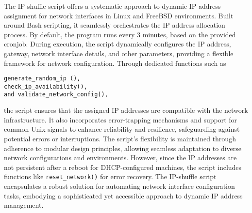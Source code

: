 The IP-shuffle script offers a systematic approach to dynamic IP address assignment for network interfaces in Linux and FreeBSD environments. Built around Bash scripting, it seamlessly orchestrates the IP address allocation process. By default, the program runs every 3 minutes, based on the provided cronjob. During execution, the script dynamically configures the IP address, gateway, network interface details, and other parameters, providing a flexible framework for network configuration. Through dedicated functions such as
\begin{verbatim}
generate_random_ip (), 
check_ip_availability(), 
and validate_network_config(), 
\end{verbatim}
the script ensures that the assigned IP addresses are compatible with the network infrastructure. It also incorporates error-trapping mechanisms and support for common Unix signals to enhance reliability and resilience, safeguarding against potential errors or interruptions. The script's flexibility is maintained through adherence to modular design principles, allowing seamless adaptation to diverse network configurations and environments. However, since the IP addresses are not persistent after a reboot for DHCP-configured machines, the script includes functions like \texttt{reset\_network()} for error recovery. The IP-shuffle script encapsulates a robust solution for automating network interface configuration tasks, embodying a sophisticated yet accessible approach to dynamic IP address management.
 